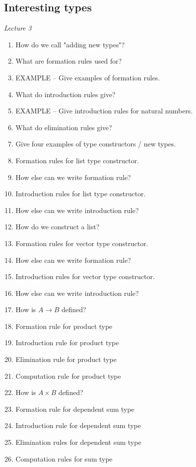 \documentclass[fleqn]{article}
\begin{document}
\subsection{Interesting types}
\textit{Lecture 3}
\begin{enumerate}
    \item How do we call "adding new types"?
    \item What are formation rules used for?
    \item EXAMPLE -- Give examples of formation rules.
    \item What do introduction rules give?
    \item EXAMPLE -- Give introduction rules for natural numbers. 
    \item What do elimination rules give?
    \item Give four examples of type constructors / new types.
    \item Formation rules for list type constructor.
    \item How else can we write formation rule?
    \item Introduction rules for list type constructor.
    \item How else can we write introduction rule?
    \item How do we construct a list?
    \item Formation rules for vector type constructor.
    \item How else can we write formation rule?
    \item Introduction rules for vector type constructor.
    \item How else can we write introduction rule?
    \item How is $A \rightarrow B$ defined?
    \item Formation rule for product type
    \item Introduction rule for product type
    \item Elimination rule for product type
    \item Computation rule for product type
    \item How is $A \times B$ defined?
    \item Formation rule for dependent sum type
    \item Introduction rule for dependent sum type
    \item Elimination rules for dependent sum type
    \item Computation rules for sum type
\end{enumerate}
\end{document}
